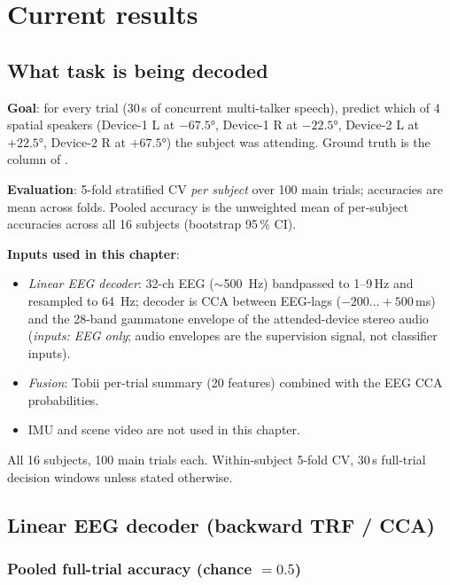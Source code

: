 \chapter{Current results}
\label{ch:results}

\section*{What task is being decoded}

\textbf{Goal}: for every trial (30\,s of concurrent multi-talker speech),
predict which of 4 spatial speakers (Device-1 L at $-67.5°$, Device-1 R
at $-22.5°$, Device-2 L at $+22.5°$, Device-2 R at $+67.5°$) the subject
was attending. Ground truth is the  column of
.

\textbf{Evaluation}: 5-fold stratified CV \emph{per subject} over 100
main trials; accuracies are mean across folds. Pooled accuracy is the
unweighted mean of per-subject accuracies across all 16 subjects
(bootstrap 95\,\% CI).

\textbf{Inputs used in this chapter}:
\begin{itemize}
  \item \emph{Linear EEG decoder}: 32-ch EEG ($\sim$\SI{500}{\Hz})
        bandpassed to 1--9\,Hz and resampled to \SI{64}{\Hz}; decoder is
        CCA between EEG-lags ($-200\ldots+500$\,ms) and the 28-band
        gammatone envelope of the attended-device stereo audio
        (\emph{inputs: EEG only}; audio envelopes are the supervision
        signal, not classifier inputs).
  \item \emph{Fusion}: Tobii  per-trial summary
        (20 features) combined with the EEG CCA probabilities.
  \item IMU and scene video are not used in this chapter.
\end{itemize}

All 16 subjects, 100 main trials each. Within-subject 5-fold CV, 30\,s
full-trial decision windows unless stated otherwise.

\section{Linear EEG decoder (backward TRF / CCA)}

\subsection{Pooled full-trial accuracy (chance $= 0.5$)}

